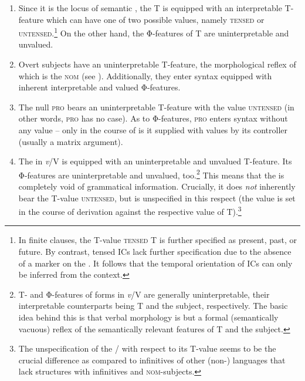 \documentclass[output=paper,colorlinks,citecolor=brown,newtxmath]{langsci/langscibook}
\begin{document}
\begin{enumerate}

\item Since it is the locus of semantic , the  T is equipped with an interpretable T-feature which can have one of two possible values, namely \textsc{tensed} or \textsc{untensed}.\footnote{In finite clauses, the T-value \textsc{tensed} T is further specified as present, past, or future. By contrast, tensed ICs lack further specification due to the absence of a  marker on the . It follows that the  temporal orientation of ICs can only be inferred from the context.} On the other hand, the Φ-features of T are uninterpretable and unvalued.

\item Overt subjects have an uninterpretable T-feature, the morphological reflex of which is the \textsc{nom} (see \citealt{PesetskyTorrego2001}). Additionally, they enter syntax equipped with inherent interpretable and valued Φ-features.

\item The null  \textsc{pro} bears an uninterpretable T-feature with the value \textsc{untensed} (in other words, \textsc{pro} has no case). As to Φ-features, \textsc{pro} enters syntax without any value -- only in the course of  is it supplied with values by its controller (usually a matrix argument).

\item The  in \textit{v}/V is equipped with an uninterpretable and unvalued T-feature. Its Φ-features are uninterpretable and unvalued, too.\footnote{T- and Φ-features of  forms in \textit{v}/V are generally uninterpretable, their interpretable counterparts being T and the subject, respectively. The basic idea behind this is that verbal  morphology is but a formal (semantically vacuous) reflex of the semantically relevant features of T and the subject.} This means that the  is completely void of grammatical information. Crucially, it does \textit{not} inherently bear the T-value \textsc{untensed}, but is unspecified in this respect (the value is set in the course of derivation against the respective value of T).\footnote{The unspecification of the /  with respect to its T-value seems to be the crucial difference as compared to infinitives of other (non-) languages that lack structures with infinitives and \textsc{nom}-subjects.}

\end{enumerate}
\end{document}
